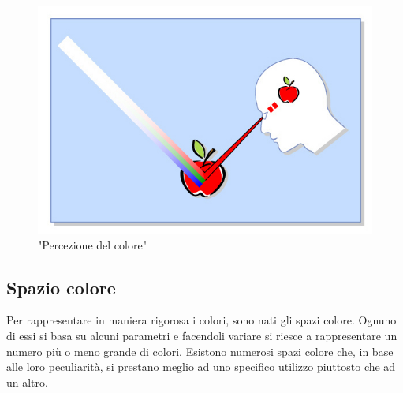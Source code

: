 \documentclass[a4paper,11pt]{article}
\begin{document}
        \begin{figure}[h]
            \centering
            \includegraphics[scale=0.8]{colorimetria1}
            \caption{"Percezione del colore"}
        \end{figure}
        \newpage
        \subsection{Spazio colore}
        Per rappresentare in maniera rigorosa i colori, sono nati gli spazi colore. Ognuno di essi si basa su alcuni parametri
        e facendoli variare si riesce a rappresentare un numero più o meno grande di colori. Esistono numerosi spazi colore
        che, in base alle loro peculiarità, si prestano meglio ad uno specifico utilizzo piuttosto che ad un altro.
       
\end{document}
